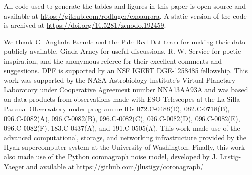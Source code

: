 \documentclass{emulateapj}
\newcommand{\XXX}[1]{#1}      %
\begin{document}
All code used to generate the tables and figures in this paper is open source and available at \url{https://github.com/rodluger/exoaurora}. \XXX{A static version of the code is archived at \url{https://doi.org/10.5281/zenodo.192459}}.\\[0in]

\acknowledgments

We thank G. Anglada-Escude and the Pale Red Dot team for making their data publicly available, Giada Arney for useful discussions, R. W. Service for poetic inspiration, \XXX{and the anonymous referee for their excellent comments and suggestions}. DPF is supported by an NSF IGERT DGE-1258485 fellowship. This work was supported by the NASA Astrobiology Institute's Virtual Planetary Laboratory under Cooperative Agreement number NNA13AA93A and was based on data products from observations made with ESO Telescopes at the La Silla Paranal Observatory under programme IDs 072.C-0488(E), 082.C-0718(B), 096.C-0082(A), 096.C-0082(B), 096.C-0082(C), 096.C-0082(D), 096.C-0082(E), 096.C-0082(F), 183.C-0437(A), and 191.C-0505(A). This work made use of the advanced computational, storage, and networking infrastructure provided by the Hyak supercomputer system at the University of Washington. \XXX{Finally, this work also made use of the Python coronagraph noise model, developed by J. Lustig-Yaeger and available at \url{https://github.com/jlustigy/coronagraph/}}



\end{document}
